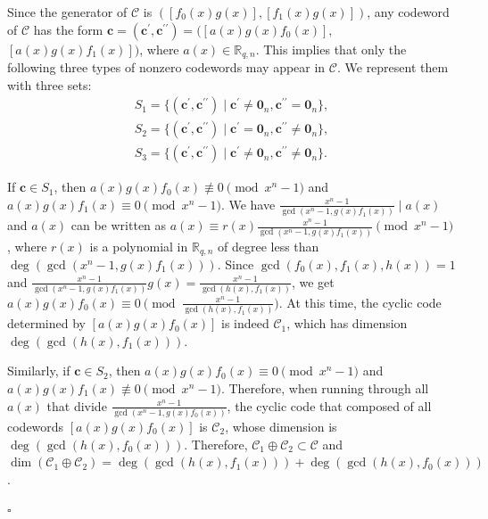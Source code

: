 \documentclass[journal]{IEEEtran}
\newenvironment{proof}{{\noindent\it Proof:} }{\hfill $\square$\par}
\begin{document}
\begin{proof}
Since the generator of $\mathscr{C}$ is $(\left[f_0(x)g(x)\right],\left[f_1(x)g(x)\right])$, any codeword of $\mathscr{C}$ has the form  $\mathbf{c}=(\mathbf{c}^{\prime},\mathbf{c}^{{\prime}{\prime}})=(\left[a(x)g(x)f_0(x)\right],$ $\left[a(x)g(x)f_1(x)\right])$, where $a(x)\in \mathbb{R}_{q,n}$. 
	This implies that only the following three types of nonzero codewords may appear in $\mathscr{C}$. We represent them with three sets:
	\begin{equation}
		\begin{matrix}
			S_1=\{ (\mathbf{c}^{\prime},\mathbf{c}^{{\prime}{\prime}})\mid \mathbf{c}^{\prime}\ne\mathbf{0}_n , \mathbf{c}^{{\prime}{\prime}} =\mathbf{0}_n \}, \\
			S_2=\{ (\mathbf{c}^{\prime},\mathbf{c}^{{\prime}{\prime}})\mid \mathbf{c}^{\prime}=\mathbf{0}_n , \mathbf{c}^{{\prime}{\prime}}\ne \mathbf{0}_n\}, \\
			S_3=\{ (\mathbf{c}^{\prime},\mathbf{c}^{{\prime}{\prime}})\mid \mathbf{c}^{\prime}\ne\mathbf{0}_n , \mathbf{c}^{{\prime}{\prime}}\ne \mathbf{0}_n\}.
		\end{matrix}
	\end{equation}


	If $\mathbf{c} \in S_1$, then $a(x)g(x)f_0(x) \not\equiv 0 \pmod{x^n-1}$ and $a(x)g(x)f_1(x)\equiv 0 \pmod{x^n-1}$. We have $\frac{x^n-1}{\gcd(x^n-1,g(x)f_1(x))}\mid a(x)$ and $a(x)$ can be written as $a(x)\equiv r(x)\frac{x^n-1}{\gcd(x^n-1,g(x)f_1(x))} \pmod{x^n-1}$, where $r(x)$ is a polynomial in $\mathbb{R}_{q,n}$ of degree less than $\deg(\gcd(x^n-1,g(x)f_1(x)))$. Since $\gcd(f_0(x),f_1(x),h(x))=1$ and $\frac{x^n-1}{\gcd(x^n-1,g(x)f_1(x))}g(x)=\frac{x^n-1}{\gcd(h(x),f_1(x))}$, we get $a(x)g(x)f_0(x) \equiv 0 \pmod{\frac{x^n-1}{\gcd(h(x),f_1(x))}}$.
 At this time, the cyclic code determined by $\left[a(x)g(x)f_0(x)\right]$ is indeed $\mathscr{C}_1$, which has dimension $\deg(\gcd( h(x),f_1(x)))$.
	
	Similarly, if $\mathbf{c} \in S_2$, then $a(x)g(x)f_0(x)\equiv 0 \pmod{x^n-1}$ and $a(x)g(x)f_1(x) \not\equiv 0 \pmod{x^n-1}$. 
 Therefore, when running through all $a(x)$ that divide $\frac{x^n-1}{\gcd(x^n-1,g(x)f_0(x))}$, the cyclic code that composed of all codewords $\left[a(x)g(x)f_0(x)\right]$ is $\mathscr{C}_2$, whose dimension is $\deg(\gcd( h(x),f_0(x)))$.
	Therefore, $\mathscr{C}_1\oplus \mathscr{C}_2 \subset \mathscr{C}$ and $\dim(\mathscr{C}_1\oplus \mathscr{C}_2)=\deg(\gcd( h(x),f_1(x)))+\deg(\gcd( h(x),f_0(x)))$.
	

\end{proof}
\end{document}
